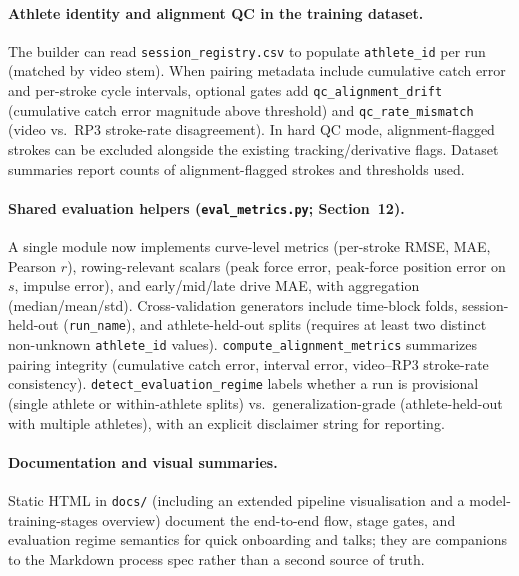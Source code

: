 \documentclass[11pt]{article}
\begin{document}
\paragraph{Athlete identity and alignment QC in the training dataset.}
The builder can read \texttt{session\_registry.csv} to populate \texttt{athlete\_id} per run (matched by video stem). When pairing metadata include cumulative catch error and per-stroke cycle intervals, optional gates add \texttt{qc\_alignment\_drift} (cumulative catch error magnitude above threshold) and \texttt{qc\_rate\_mismatch} (video vs.\ RP3 stroke-rate disagreement). In hard QC mode, alignment-flagged strokes can be excluded alongside the existing tracking/derivative flags. Dataset summaries report counts of alignment-flagged strokes and thresholds used.

\paragraph{Shared evaluation helpers (\texttt{eval\_metrics.py}; Section~12).}
A single module now implements curve-level metrics (per-stroke RMSE, MAE, Pearson $r$), rowing-relevant scalars (peak force error, peak-force position error on $s$, impulse error), and early/mid/late drive MAE, with aggregation (median/mean/std). Cross-validation generators include time-block folds, session-held-out (\texttt{run\_name}), and athlete-held-out splits (requires at least two distinct non-unknown \texttt{athlete\_id} values). \texttt{compute\_alignment\_metrics} summarizes pairing integrity (cumulative catch error, interval error, video--RP3 stroke-rate consistency). \texttt{detect\_evaluation\_regime} labels whether a run is provisional (single athlete or within-athlete splits) vs.\ generalization-grade (athlete-held-out with multiple athletes), with an explicit disclaimer string for reporting.

\paragraph{Documentation and visual summaries.}
Static HTML in \texttt{docs/} (including an extended pipeline visualisation and a model-training-stages overview) document the end-to-end flow, stage gates, and evaluation regime semantics for quick onboarding and talks; they are companions to the Markdown process spec rather than a second source of truth.
\end{document}
